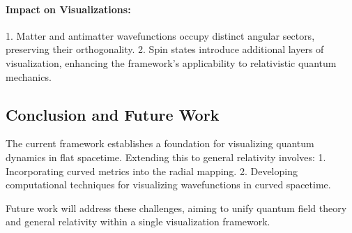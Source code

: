 \documentclass[12pt]{article}
\begin{document}
\paragraph{Impact on Visualizations:}
1. Matter and antimatter wavefunctions occupy distinct angular sectors, preserving their orthogonality.
2. Spin states introduce additional layers of visualization, enhancing the framework's applicability to relativistic quantum mechanics.

\subsection{Conclusion and Future Work}
The current framework establishes a foundation for visualizing quantum dynamics in flat spacetime. Extending this to general relativity involves:
1. Incorporating curved metrics into the radial mapping.
2. Developing computational techniques for visualizing wavefunctions in curved spacetime.

Future work will address these challenges, aiming to unify quantum field theory and general relativity within a single visualization framework.
\end{document}
